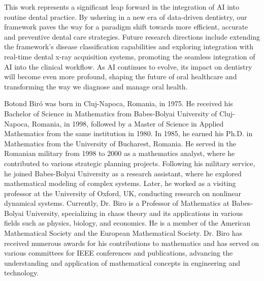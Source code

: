 \documentclass[journal,twoside,web]{ieeecolor}
\begin{document}
This work represents a significant leap forward in the integration of AI into routine dental practice. By ushering in a new era of data-driven dentistry, our framework paves the way for a paradigm shift towards more efficient, accurate and preventive dental care strategies.  Future research directions include extending the framework's disease classification capabilities and exploring integration with real-time dental x-ray acquisition systems, promoting the seamless integration of AI into the clinical workflow. As AI continues to evolve, its impact on dentistry will become even more profound, shaping the future of oral healthcare and transforming the way we diagnose and manage oral health.










\begin{IEEEbiography}{Botond Biró} was born in Cluj-Napoca, Romania, in 1975. He received his Bachelor of Science in Mathematics from Babes-Bolyai University of Cluj-Napoca, Romania, in 1998, followed by a Master of Science in Applied Mathematics from the same institution in 1980. In 1985, he earned his Ph.D. in Mathematics from the University of Bucharest, Romania.
    He served in the Romanian military from 1998 to 2000 as a mathematics analyst, where he contributed to various strategic planning projects. Following his military service, he joined Babes-Bolyai University as a research assistant, where he explored mathematical modeling of complex systems. Later, he worked as a visiting professor at the University of Oxford, UK, conducting research on nonlinear dynamical systems.
    Currently, Dr. Biro is a Professor of Mathematics at Babes-Bolyai University, specializing in chaos theory and its applications in various fields such as physics, biology, and economics. He is a member of the American Mathematical Society and the European Mathematical Society.
    Dr. Biro has received numerous awards for his contributions to mathematics and has served on various committees for IEEE conferences and publications, advancing the understanding and application of mathematical concepts in engineering and technology.
\end{IEEEbiography}
\end{document}
